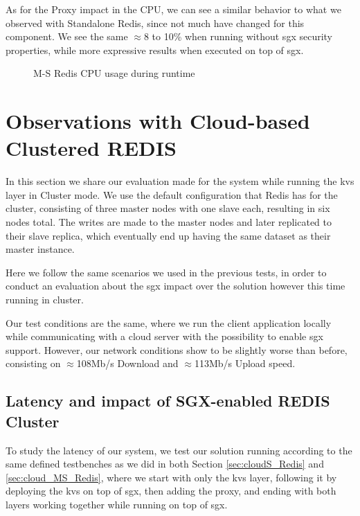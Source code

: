 As for the Proxy impact in the CPU, we can see a similar behavior to what we observed with Standalone Redis, since not much have changed for this component. We see the same $\approx$8 to 10\% when running without \gls{sgx} security properties, while more expressive results when executed on top of \gls{sgx}.

\begin{figure}[htbp]
	\centering
	\caption{M-S Redis CPU usage during runtime}
	\label{fig:cpuUsageMS}
\end{figure}

\section{Observations with Cloud-based Clustered REDIS}
In this section we share our evaluation made for the system while running the \gls{kvs} layer in Cluster mode. We use the default configuration that Redis has for the cluster, consisting of three master nodes with one slave each, resulting in six nodes total. The writes are made to the master nodes and later replicated to their slave replica, which eventually end up having the same dataset as their master instance. 

Here we follow the same scenarios we used in the previous tests, in order to conduct an evaluation about the \gls{sgx} impact over the solution however this time running in cluster.

Our test conditions are the same, where we run the client application locally while communicating with a cloud server with the possibility to enable \gls{sgx} support. However, our network conditions show to be slightly worse than before, consisting on $\approx$108Mb/s Download and $\approx$113Mb/s Upload speed.

\subsection{Latency and impact of SGX-enabled REDIS Cluster}

To study the latency of our system, we test our solution running according to the same defined testbenches as we did in both Section \ref{sec:cloudS_Redis} and \ref{sec:cloud_MS_Redis}, where we start with only the \gls{kvs} layer, following it by deploying the \gls{kvs} on top of \gls{sgx}, then adding the proxy, and ending with both layers working together while running on top of \gls{sgx}. 

